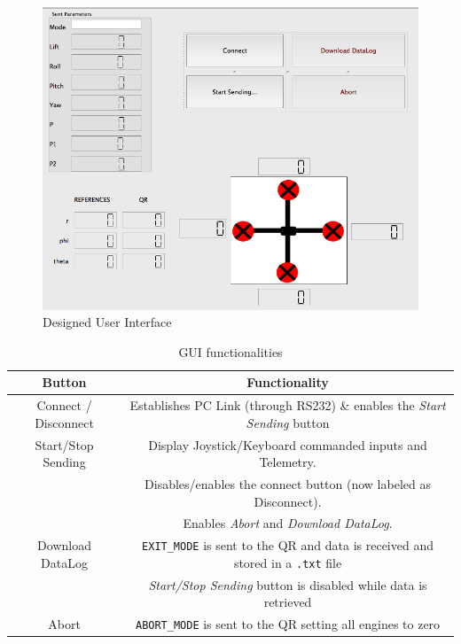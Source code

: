 \documentclass{article}
\begin{document}
\begin{figure}[ht]
\centering
	\includegraphics[scale=0.35]{Figures/GUI.png}
	\caption{Designed User Interface}
	\label{fig.GUI}
\end{figure}

\begin{table}[ht]
\centering
\begin{tabular}{|c|c|}
\hline 
\textbf{Button} & \textbf{Functionality} \\ 
\hline 
\hline 
Connect / Disconnect & Establishes PC Link (through RS232) \& enables the \emph{Start Sending} button  \\
\hline 
Start/Stop Sending & Display Joystick/Keyboard commanded inputs and Telemetry. 
\\ & Disables/enables the connect button (now labeled as Disconnect).
\\ & Enables \emph{Abort} and \emph{Download DataLog}.
\\
\hline 
Download DataLog & \texttt{EXIT\_MODE} is sent to the QR and data is received and stored in a \texttt{.txt} file
\\ & \emph{Start/Stop Sending} button is disabled while data is retrieved\\
\hline 
Abort & \texttt{ABORT\_MODE} is sent to the QR setting all engines to zero\\ 
\hline 
\end{tabular} 
\caption{GUI functionalities}
\label{tbl:GUIButts}
\end{table}
\end{document}
